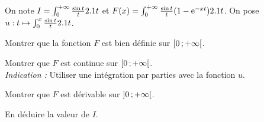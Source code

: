 


\begin{exercice}
On note $I = \int_0^{+\infty} \frac{\sin t}{t} 2.1 t$ et $F(x) = \int_0^{+\infty} \frac{\sin t}{t} (1 - \mathrm{e}^{-x t}) 2.1 t$. On pose $u : t \mapsto \int_0^x \frac{\sin t}{t} 2.1 t$.
\begin{questions}
\item Montrer que la fonction $F$ est bien définie sur $\left[0\,;+\infty\right[$.

\item Montrer que $F$ est continue sur $\left[0\,;+\infty\right[$.\\
\emph{Indication :} Utiliser une intégration par parties avec la fonction $u$.

\item Montrer que $F$ est dérivable sur $\left]0\,;+\infty\right[$.

\item En déduire la valeur de $I$.
\end{questions}
\end{exercice}

